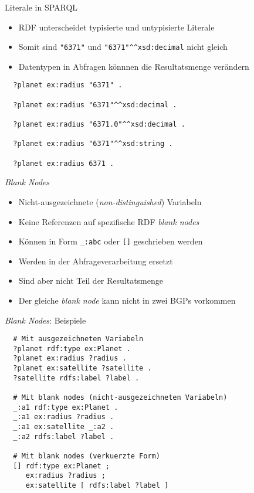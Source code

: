 \documentclass{beamer}
\begin{document}
\begin{frame}[fragile]{Literale in SPARQL}
	
	\begin{itemize}
		\item RDF unterscheidet typisierte und untypisierte Literale
		\item Somit sind \texttt{"6371"} und \texttt{"6371"\^{}\^{}xsd:decimal} nicht gleich
		\item Datentypen in Abfragen könnnen die Resultatsmenge verändern
	\end{itemize}
	
	\small
	\begin{lstlisting}
  ?planet ex:radius "6371" .
  
  ?planet ex:radius "6371"^^xsd:decimal .
  
  ?planet ex:radius "6371.0"^^xsd:decimal .
    
  ?planet ex:radius "6371"^^xsd:string .
  
  ?planet ex:radius 6371 .
		\end{lstlisting}
	
\end{frame}

\begin{frame}{\emph{Blank Nodes}}
	
	\begin{itemize}
		\item Nicht-ausgezeichnete (\emph{non-distinguished}) Variabeln
		\item Keine Referenzen auf spezifische RDF \emph{blank nodes}
		\item Können in Form \texttt{\_:abc} oder \texttt{[]} geschrieben werden
		\item Werden in der Abfrageverarbeitung ersetzt
		\item Sind aber nicht Teil der Resultatsmenge
		\item Der gleiche \emph{blank node} kann nicht in zwei BGPs vorkommen
	\end{itemize}
	
\end{frame}

\begin{frame}[fragile]{\emph{Blank Nodes}: Beispiele}
	
	\small
	\begin{lstlisting}
  # Mit ausgezeichneten Variabeln
  ?planet rdf:type ex:Planet .
  ?planet ex:radius ?radius .
  ?planet ex:satellite ?satellite .
  ?satellite rdfs:label ?label .
     
  # Mit blank nodes (nicht-ausgezeichneten Variabeln)
  _:a1 rdf:type ex:Planet .
  _:a1 ex:radius ?radius .
  _:a1 ex:satellite _:a2 .
  _:a2 rdfs:label ?label .
  
  # Mit blank nodes (verkuerzte Form)
  [] rdf:type ex:Planet ;
     ex:radius ?radius ;
     ex:satellite [ rdfs:label ?label ]
	\end{lstlisting}
	
\end{frame}
\end{document}
